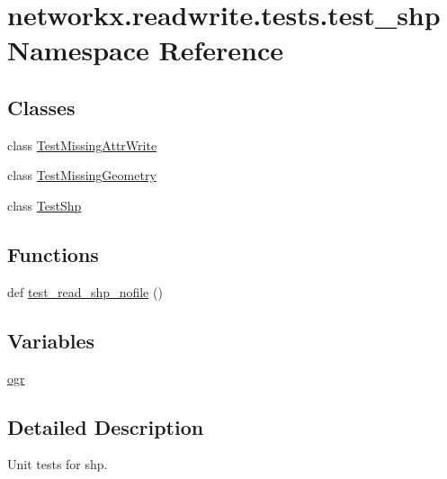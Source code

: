 \hypertarget{namespacenetworkx_1_1readwrite_1_1tests_1_1test__shp}{}\section{networkx.\+readwrite.\+tests.\+test\+\_\+shp Namespace Reference}
\label{namespacenetworkx_1_1readwrite_1_1tests_1_1test__shp}
\subsection*{Classes}
\begin{DoxyCompactItemize}
\item 
class \hyperlink{classnetworkx_1_1readwrite_1_1tests_1_1test__shp_1_1TestMissingAttrWrite}{Test\+Missing\+Attr\+Write}
\item 
class \hyperlink{classnetworkx_1_1readwrite_1_1tests_1_1test__shp_1_1TestMissingGeometry}{Test\+Missing\+Geometry}
\item 
class \hyperlink{classnetworkx_1_1readwrite_1_1tests_1_1test__shp_1_1TestShp}{Test\+Shp}
\end{DoxyCompactItemize}
\subsection*{Functions}
\begin{DoxyCompactItemize}
\item 
def \hyperlink{namespacenetworkx_1_1readwrite_1_1tests_1_1test__shp_acb4ea9a1911ea9b88c5fadf6bbd196ae}{test\+\_\+read\+\_\+shp\+\_\+nofile} ()
\end{DoxyCompactItemize}
\subsection*{Variables}
\begin{DoxyCompactItemize}
\item 
\hyperlink{namespacenetworkx_1_1readwrite_1_1tests_1_1test__shp_adc81dbf48528d655b90c2fde46574ab5}{ogr}
\end{DoxyCompactItemize}


\subsection{Detailed Description}
\begin{DoxyVerb}Unit tests for shp.
\end{DoxyVerb}
 

